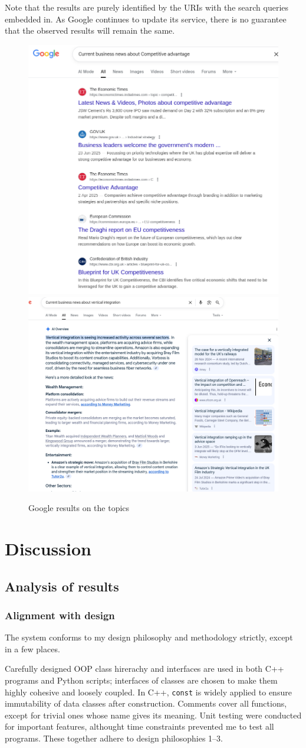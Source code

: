 \documentclass[final-report]{report-template}
\begin{document}
Note that the results are purely identified by the URIs with the search queries
embedded in. As Google continues to update its service, there is no guarantee
that the observed results will remain the same.

\begin{figure}[hbtp!]
	\centering
	\includegraphics[width=.3\textwidth]{res/google_res1.png}
	\includegraphics[width=.5\textwidth]{res/google_res2.png}
	\caption{Google results on the topics}
	\label{fig.results.google}
\end{figure}


\section{Discussion}
\subsection{Analysis of results}
\subsubsection{Alignment with design}
The system conforms to my design philosophy and methodology strictly, except
in a few places. 

Carefully designed OOP class hirerachy and interfaces are used in both C++
programs and Python scripts; interfaces of classes are chosen to make them
highly cohesive and loosely coupled. In C++, \texttt{const} is widely applied
to ensure immutability of data classes after construction. Comments cover all
functions, except for trivial ones whose name gives its meaning. Unit testing
were conducted for important features, althought time constraints prevented me
to test all programs. These together adhere to design philosophies 1--3.
\end{document}
